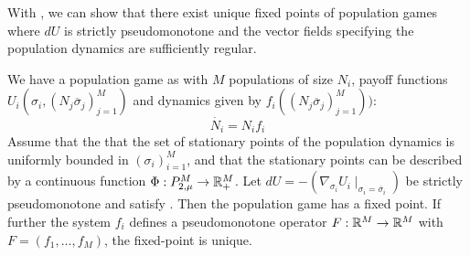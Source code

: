 With , we can show that there exist unique fixed points of population games where $dU$ is strictly pseudomonotone and the vector fields specifying the population dynamics are sufficiently regular.
\begin{theorem}
  \label{thm:pop_game_exists_unique}
  We have a population game as  with $M$ populations of size $N_i$, payoff functions $U_i(\sigma_i, (N_j \overbar{\sigma}_j)_{j=1}^M)$ and dynamics given by $f_i((N_j \overbar{\sigma}_j)_{j=1}^M))$:
  \begin{equation}
    \dot{N_i} = N_i f_i
  \end{equation}
  Assume that the that the set of stationary points of the population dynamics is uniformly bounded in $(\sigma_i)_{i=1}^M$, and that the stationary points can be described by a continuous function $\Phi:P_{2,\mu}^M \to \mathbb{R}_+^M$. Let $dU = -(\nabla_{\sigma_i} U_i \mid_{\sigma_i = \overbar{\sigma}_i})$ be strictly pseudomonotone and satisfy . Then the population game has a fixed point.
  If further the system $f_i$ defines a pseudomonotone operator $F:\mathbb{R}^M \to \mathbb{R}^M$ with $F=(f_1, \dots, f_M)$, the fixed-point is unique.
\end{theorem}
